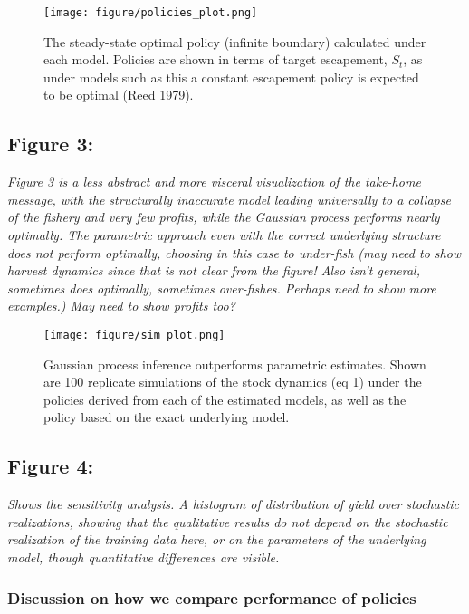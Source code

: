 \documentclass[author-year, review]{elsarticle} %
\makeatletter
\def\maxwidth{\ifdim\Gin@nat@width>\linewidth\linewidth
\else\Gin@nat@width\fi}
\let\Oldincludegraphics\includegraphics
\renewcommand{\includegraphics}[1]{\Oldincludegraphics[width=\maxwidth]{#1}}
\makeatother
\begin{document}
\begin{figure}[htbp]
\centering
\texttt{[image: figure/policies\_plot.png]}
\caption{The steady-state optimal policy (infinite boundary) calculated
under each model. Policies are shown in terms of target escapement,
$S_t$, as under models such as this a constant escapement policy is
expected to be optimal (Reed 1979).}
\end{figure}

\subsection{Figure 3:}

\emph{Figure 3 is a less abstract and more visceral visualization of the
take-home message, with the structurally inaccurate model leading
universally to a collapse of the fishery and very few profits, while the
Gaussian process performs nearly optimally. The parametric approach even
with the correct underlying structure does not perform optimally,
choosing in this case to under-fish (may need to show harvest dynamics
since that is not clear from the figure! Also isn't general, sometimes
does optimally, sometimes over-fishes. Perhaps need to show more
examples.) May need to show profits too?}

\begin{figure}[htbp]
\centering
\texttt{[image: figure/sim\_plot.png]}
\caption{Gaussian process inference outperforms parametric estimates.
Shown are 100 replicate simulations of the stock dynamics (eq 1) under
the policies derived from each of the estimated models, as well as the
policy based on the exact underlying model.}
\end{figure}

\subsection{Figure 4:}

\emph{Shows the sensitivity analysis. A histogram of distribution of
yield over stochastic realizations, showing that the qualitative results
do not depend on the stochastic realization of the training data here,
or on the parameters of the underlying model, though quantitative
differences are visible.}

\subsubsection{Discussion on how we compare performance of policies}
\end{document}
